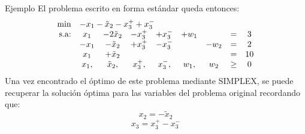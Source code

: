 \documentclass[10pt, aspectratio=169]{beamer}
\begin{document}
    \begin{frame}{Ejemplo}
        El problema escrito en forma estándar queda entonces:
        \[\begin{array}{rcccccccc}
              \min & \multicolumn{7}{l}{-x_1 - \tilde{x}_2 - x_3^++x_3^-} \\
              \text{s.a:} & x_1  & - 2\tilde{x}_2 & - x_3^+ & +x_3^- & +w_1 &       & =    & 3  \\
              & -x_1 & - \tilde{x}_2  & + x_3^+ & -x_3^- &      & - w_2 & =    & 2  \\
              & x_1  & + \tilde{x}_2  &         &        &      &       & =    & 10 \\
              & x_1, & \tilde{x}_2,   & x_3^+,  & x_3^-, & w_1, & w_2   & \geq & 0
        \end{array}
        \]
        Una vez encontrado el óptimo de este problema mediante SIMPLEX, se puede recuperar la solución óptima para las
        variables del problema original recordando que:
        $$x_2 = -\tilde{x}_2$$
        $$x_3 = x_3^+-x_3^- $$
    \end{frame}
\end{document}
